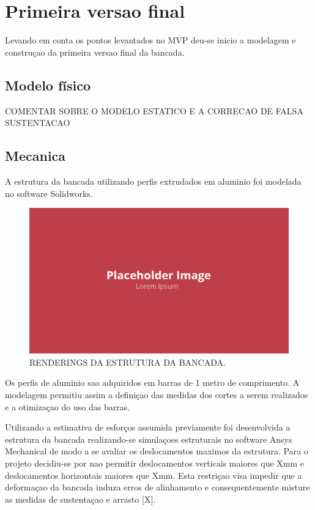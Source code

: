 \section{Primeira versao final}

Levando em conta os pontos levantados no MVP deu-se inicio a modelagem e construçao da primeira versao final da bancada.

\subsection{Modelo físico}

COMENTAR SOBRE O MODELO ESTATICO E A CORRECAO DE FALSA SUSTENTACAO

\subsection{Mecanica}

A estrutura da bancada utilizando perfis extrudados em aluminio foi modelada no software Solidworks.

\begin{figure}[!ht]
    \centering
    \includegraphics[width=.8\linewidth]{figuras/placeholder.png}
    \caption{RENDERINGS DA ESTRUTURA DA BANCADA\cite{autor}.}
    \label{fig:placeholder}
\end{figure}

Os perfis de aluminio sao adquiridos em barras de 1 metro de comprimento. A modelagem permitiu assim a definiçao das medidas dos cortes a serem realizados e a otimizaçao do uso das barras.

Utilizando a estimativa de esforços assumida previamente foi desenvolvida a estrutura da bancada realizando-se simulaçoes estruturais no software Ansys Mechanical de modo a se avaliar os deslocamentos maximos da estrutura. Para o projeto decidiu-se por nao permitir deslocamentos verticais maiores que Xmm e deslocamentos horizontais maiores que Xmm. Esta restriçao visa impedir que a deformaçao da bancada induza erros de alinhamento e consequentemente misture as medidas de sustentaçao e arrasto [X].

